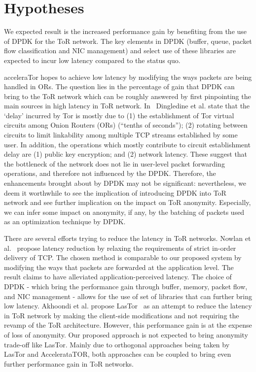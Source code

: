 \section{Hypotheses}
\label{sec:hypotheses}

We expected result is the increased performance gain by benefiting from the use of DPDK for the ToR network. The key elements in DPDK (buffer, queue, packet flow classification and NIC management) and select use of these libraries are expected to incur low latency compared to the status quo.

acceleraTor hopes to achieve low latency by modifying the ways packets are being handled in ORs. The question lies in the percentage of gain that DPDK can bring to the ToR network which can be roughly answered by first pinpointing the main sources in high latency in ToR network. In~\cite{Dingledine:2004:TSO:1251375.1251396} Dingledine et al. state that the `delay' incurred by Tor is mostly due to (1) the establishment of Tor virtual circuits among Onion Routers (ORs) (``tenths of seconds''); (2) rotating between circuits to limit linkability among multiple TCP streams established by some user. In addition, the operations which mostly contribute to circuit establishment delay are (1) public key encryption; and (2) network latency. These suggest that the bottleneck of the network does not lie in user-level packet forwarding operations, and therefore not influenced by the DPDK. Therefore, the enhancements brought about by DPDK may not be significant: nevertheless, we deem it worthwhile to see the implication of introducing DPDK into ToR network and see further implication on the impact on ToR anonymity. Especially, we can infer some impact on anonymity, if any, by the batching of packets used as an optimization technique by DPDK. 

There are several efforts trying to reduce the latency in ToR networks. Nowlan et al.~\cite{179191} propose latency reduction by relaxing the requirements of strict in-order delivery of TCP. The chosen method is comparable to our proposed system by modifying the ways that packets are forwarded at the application level. The result claims to have alleviated application-perceived latency. The choice of DPDK - which bring the performance gain through buffer, memory, packet flow, and NIC management - allows for the use of set of libraries that can further bring low latency. Akhoondi et al. propose LasTor~\cite{Akhoondi:2012:LLA:2310656.2310712} as an attempt to reduce the latency in ToR network by making the client-side modifications and not requiring the revamp of the ToR architecture. However, this performance gain is at the expense of loss of anonymity. Our proposed  approach is not expected to bring anonymity trade-off like LasTor. Mainly due to orthogonal approaches being taken by LasTor and AccelerataTOR, both approaches can be coupled to bring even further performance gain in ToR networks. 
